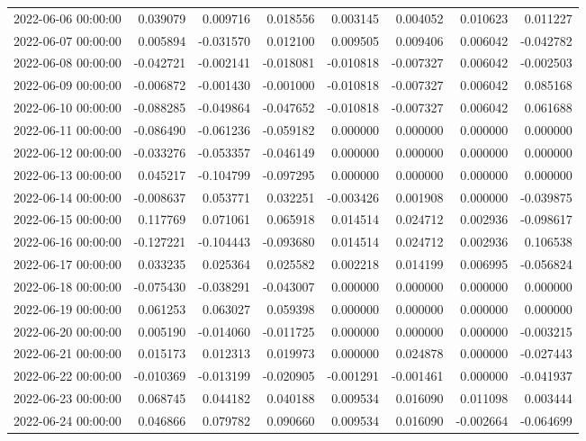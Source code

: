 \begin{tabular}{lrrrrrrr}
2022-06-06 00:00:00 & 0.039079 & 0.009716 & 0.018556 & 0.003145 & 0.004052 & 0.010623 & 0.011227 \\
2022-06-07 00:00:00 & 0.005894 & -0.031570 & 0.012100 & 0.009505 & 0.009406 & 0.006042 & -0.042782 \\
2022-06-08 00:00:00 & -0.042721 & -0.002141 & -0.018081 & -0.010818 & -0.007327 & 0.006042 & -0.002503 \\
2022-06-09 00:00:00 & -0.006872 & -0.001430 & -0.001000 & -0.010818 & -0.007327 & 0.006042 & 0.085168 \\
2022-06-10 00:00:00 & -0.088285 & -0.049864 & -0.047652 & -0.010818 & -0.007327 & 0.006042 & 0.061688 \\
2022-06-11 00:00:00 & -0.086490 & -0.061236 & -0.059182 & 0.000000 & 0.000000 & 0.000000 & 0.000000 \\
2022-06-12 00:00:00 & -0.033276 & -0.053357 & -0.046149 & 0.000000 & 0.000000 & 0.000000 & 0.000000 \\
2022-06-13 00:00:00 & 0.045217 & -0.104799 & -0.097295 & 0.000000 & 0.000000 & 0.000000 & 0.000000 \\
2022-06-14 00:00:00 & -0.008637 & 0.053771 & 0.032251 & -0.003426 & 0.001908 & 0.000000 & -0.039875 \\
2022-06-15 00:00:00 & 0.117769 & 0.071061 & 0.065918 & 0.014514 & 0.024712 & 0.002936 & -0.098617 \\
2022-06-16 00:00:00 & -0.127221 & -0.104443 & -0.093680 & 0.014514 & 0.024712 & 0.002936 & 0.106538 \\
2022-06-17 00:00:00 & 0.033235 & 0.025364 & 0.025582 & 0.002218 & 0.014199 & 0.006995 & -0.056824 \\
2022-06-18 00:00:00 & -0.075430 & -0.038291 & -0.043007 & 0.000000 & 0.000000 & 0.000000 & 0.000000 \\
2022-06-19 00:00:00 & 0.061253 & 0.063027 & 0.059398 & 0.000000 & 0.000000 & 0.000000 & 0.000000 \\
2022-06-20 00:00:00 & 0.005190 & -0.014060 & -0.011725 & 0.000000 & 0.000000 & 0.000000 & -0.003215 \\
2022-06-21 00:00:00 & 0.015173 & 0.012313 & 0.019973 & 0.000000 & 0.024878 & 0.000000 & -0.027443 \\
2022-06-22 00:00:00 & -0.010369 & -0.013199 & -0.020905 & -0.001291 & -0.001461 & 0.000000 & -0.041937 \\
2022-06-23 00:00:00 & 0.068745 & 0.044182 & 0.040188 & 0.009534 & 0.016090 & 0.011098 & 0.003444 \\
2022-06-24 00:00:00 & 0.046866 & 0.079782 & 0.090660 & 0.009534 & 0.016090 & -0.002664 & -0.064699 \\

\end{tabular}
